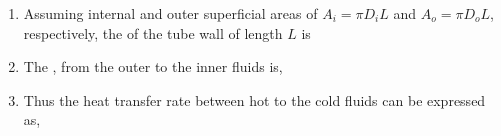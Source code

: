 \documentclass[10pt,compress,unknownkeysallowed]{beamer}
\begin{document}
\begin{frame}
\begin{columns}
\begin{column}[l]{0.5\linewidth}
\begin{enumerate}
            \item<2-> Assuming internal and outer superficial areas of $A_{i}=\pi D_{i}L$ and $A_{o}=\pi D_{o}L$, respectively, the  of the tube wall of length $L$ is
            \item<3-> The ,  from the outer to the inner fluids is,
            \item<4-> Thus the heat transfer rate between hot to the cold fluids can be expressed as,

         \end{enumerate}
       \end{column}      
    \end{columns}
\end{frame}
\end{document}
